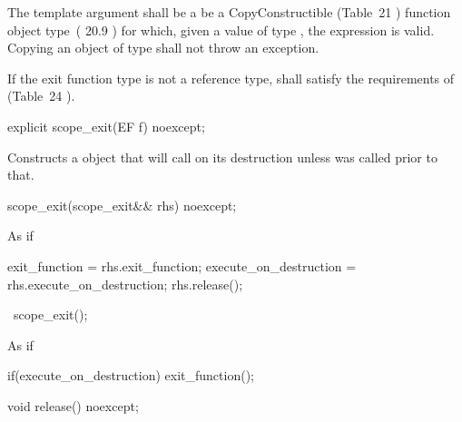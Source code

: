 \documentclass[ebook,11pt,article]{memoir}
\begin{document}
\pnum
The template argument
 shall be a be a CopyConstructible (Table~21
) function
object type~(
20.9
) 
for which, given
a value  of type , the expression
 is valid. Copying an object of type  shall not throw an exception. 

\pnum
If the exit function type  is not a reference type,  shall satisfy
the requirements of  (Table~24
).

\begin{itemdecl}
explicit
scope_exit(EF f) noexcept;
\end{itemdecl}

\begin{itemdescr}
\pnum
\effects Constructs a  object that will call  on its destruction unless  was called prior to that.
\end{itemdescr}

\begin{itemdecl}
scope_exit(scope_exit&& rhs) noexcept;
\end{itemdecl}

\begin{itemdescr}
\pnum
\effects As if
\begin{codeblock}
  exit_function = rhs.exit_function;
  execute_on_destruction = rhs.execute_on_destruction;
  rhs.release();
\end{codeblock}
\end{itemdescr}

\begin{itemdecl}
~scope_exit();
\end{itemdecl}

\begin{itemdescr}
\pnum
\effects As if
\begin{codeblock}
  if(execute_on_destruction)
    exit_function();
\end{codeblock}
\end{itemdescr}

\begin{itemdecl}
void release() noexcept;
\end{itemdecl}
\end{document}
